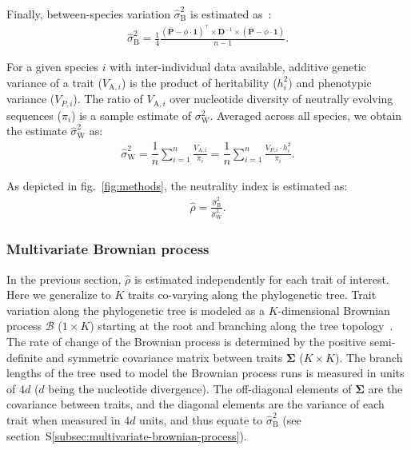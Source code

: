 \documentclass{article}
\newcommand{\Multiply}{\cdot}
\newcommand{\MultiplyMatrix}{\times}
\newcommand{\UniDimArray}[1]{\bm{#1}}
\newcommand{\BiDimArray}[1]{\bm{#1}}
\newcommand{\tr}{^{\intercal}}
\newcommand{\inv}{^{-1}}
\newcommand{\Spi}{i}
\newcommand{\NbrTaxa}{n}
\newcommand{\Trait}{P}
\newcommand{\Heritability}{h^2}
\newcommand{\VecTrait}{\UniDimArray{\bar{\Trait}}}
\newcommand{\RootTrait}{\phi}
\newcommand{\VecOne}{\UniDimArray{1}}
\newcommand{\Distance}{\BiDimArray{D}}
\newcommand{\DistanceMatrix}{\BiDimArray{\Distance}}
\newcommand{\VarGeneticSpi}{V_{\mathrm{A}, \Spi}}
\newcommand{\RateWhithin}{\sigma^2_{\mathrm{W}}}
\newcommand{\EstRateBetween}{\widehat{\sigma}^2_{\mathrm{B}}}
\newcommand{\EstRateWhithin}{\widehat{\sigma}^2_{\mathrm{W}}}
\newcommand{\EstNI}{\widehat{\rho}}
\newcommand{\Ntrait}{K}
\newcommand{\Covariancematrix}{\Sigma}
\newcommand{\CovarianceMatrix}{\BiDimArray{\Covariancematrix}}
\newcommand{\brownian}{\mathcal{B}}
\newcommand{\Brownian}{\UniDimArray{\brownian}}
\begin{document}
Finally, between-species variation $\EstRateBetween$ is estimated as~\citep{omeara_testing_2006}:
\begin{gather}
    \EstRateBetween = \frac{1}{4}\frac{\left( \VecTrait -  \RootTrait \Multiply \VecOne \right)\tr \MultiplyMatrix \DistanceMatrix\inv \MultiplyMatrix \left( \VecTrait -  \RootTrait \Multiply \VecOne  \right)}{\NbrTaxa - 1}. \label{eq:estimated-rate-phy}
\end{gather}

For a given species $\Spi$ with inter-individual data available, additive genetic variance of a trait ($\VarGeneticSpi$) is the product of heritability ($\Heritability_{i}$) and phenotypic variance ($V_{\Trait, i}$).
The ratio of $\VarGeneticSpi$ over nucleotide diversity of neutrally evolving sequences ($\pi_{\Spi}$) is a sample estimate of $\RateWhithin$.
Averaged across all species, we obtain the estimate $\EstRateWhithin$ as:
\begin{gather}
    \EstRateWhithin = \dfrac{1}{\NbrTaxa}\sum_{i=1}^{\NbrTaxa}\frac{  \VarGeneticSpi}{ \pi_{i}} = \dfrac{1}{\NbrTaxa}\sum_{i=1}^{\NbrTaxa} \frac{  V_{\Trait, i} \Multiply \Heritability_{i}}{ \pi_{i}}. \label{eq:estimated-rate-pop}
\end{gather}

As depicted in fig.~\ref{fig:methods}, the neutrality index is estimated as:
\begin{gather}
    \EstNI = \frac{\EstRateBetween}{\EstRateWhithin}. \label{eq:estimated-NI}
\end{gather}

\subsubsection*{Multivariate Brownian process}

In the previous section, $\EstNI$ is estimated independently for each trait of interest.
Here we generalize to $\Ntrait$ traits co-varying along the phylogenetic tree.
Trait variation along the phylogenetic tree is modeled as a $\Ntrait$-dimensional Brownian process $\Brownian$ ($1 \times \Ntrait$) starting at the root and branching along the tree topology~\citep{huelsenbeck_detecting_2003, lartillot_phylogenetic_2011, lartillot_joint_2012, latrille_inferring_2021}.
The rate of change of the Brownian process is determined by the positive semi-definite and symmetric covariance matrix between traits $\CovarianceMatrix$ ($\Ntrait \times \Ntrait$).
The branch lengths of the tree used to model the Brownian process runs is measured in units of $4d$ ($d$ being the nucleotide divergence).
The off-diagonal elements of $\CovarianceMatrix$ are the covariance between traits, and the diagonal elements are the variance of each trait when measured in $4d$ units, and thus equate to $\EstRateBetween$ (see section~S\ref{subsec:multivariate-brownian-process}).
\end{document}
